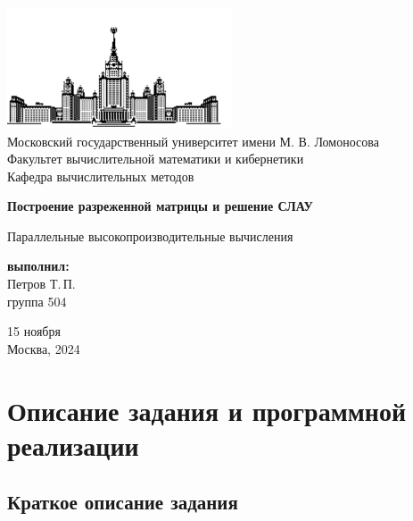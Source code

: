 \documentclass[12pt, a4paper]{article}
\begin{document}
	
\thispagestyle{empty}

\begin{center}
	\ \vspace{-3cm}
	
	\includegraphics[width=0.5\textwidth]{msu-eps-converted-to.pdf}\\
	{Московский государственный университет имени М. В. Ломоносова}\\
	Факультет вычислительной математики и кибернетики\\
	Кафедра вычислительных методов
	
	\vspace{6cm}
	
	{\Large \bfseries Построение разреженной матрицы и решение СЛАУ}
	
	\vspace{1cm}
	
	{\large Параллельные высокопроизводительные вычисления}
\end{center}

\vfill

\begin{flushright}
	\textbf{выполнил:}\\
	Петров Т.\,П. \\
	группа 504
\end{flushright}

\vfill

\begin{center}
	15 ноября \\
	Москва, 2024
\end{center}

\enlargethispage{2\baselineskip}

\newpage

\tableofcontents

\newpage

\section{Описание задания и программной реализации}
\subsection{Краткое описание задания}
\end{document}

